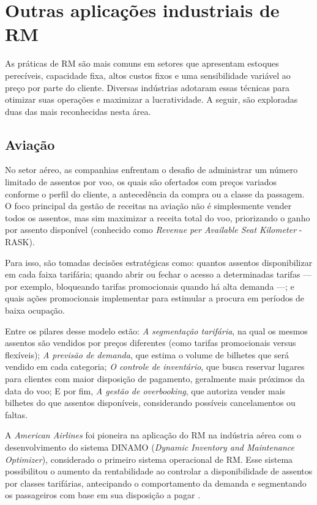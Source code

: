\section{Outras aplicações industriais de RM}
As práticas de RM são mais comuns em setores que apresentam estoques perecíveis, capacidade fixa, altos custos fixos e uma sensibilidade variável ao preço por parte do cliente. Diversas indústrias adotaram essas técnicas para otimizar suas operações e maximizar a lucratividade. A seguir, são exploradas duas das mais reconhecidas nesta área.

\subsection{Aviação}
No setor aéreo, as companhias enfrentam o desafio de administrar um número limitado de assentos por voo, os quais são ofertados com preços variados conforme o perfil do cliente, a antecedência da compra ou a classe da passagem. O foco principal da gestão de receitas na aviação não é simplesmente vender todos os assentos, mas sim maximizar a receita total do voo, priorizando o ganho por assento disponível (conhecido como \textit{Revenue per Available Seat Kilometer} - RASK).

Para isso, são tomadas decisões estratégicas como: quantos assentos disponibilizar em cada faixa tarifária; quando abrir ou fechar o acesso a determinadas tarifas — por exemplo, bloqueando tarifas promocionais quando há alta demanda —; e quais ações promocionais implementar para estimular a procura em períodos de baixa ocupação.

Entre os pilares desse modelo estão: \textit{A segmentação tarifária}, na qual os mesmos assentos são vendidos por preços diferentes (como tarifas promocionais versus flexíveis); \textit{A previsão de demanda}, que estima o volume de bilhetes que será vendido em cada categoria; \textit{O controle de inventário}, que busca reservar lugares para clientes com maior disposição de pagamento, geralmente mais próximos da data do voo; E por fim, \textit{A gestão de overbooking}, que autoriza vender mais bilhetes do que assentos disponíveis, considerando possíveis cancelamentos ou faltas.

A \textit{American Airlines} foi pioneira na aplicação do RM na indústria aérea com o desenvolvimento do sistema DINAMO (\textit{Dynamic Inventory and Maintenance Optimizer}), considerado o primeiro sistema operacional de RM. Esse sistema possibilitou o aumento da rentabilidade ao controlar a disponibilidade de assentos por classes tarifárias, antecipando o comportamento da demanda e segmentando os passageiros com base em sua disposição a pagar \citep{Smith1992}.

